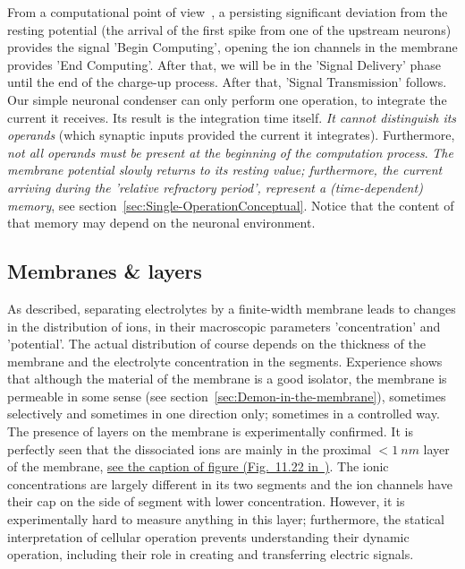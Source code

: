 From a computational point of view~\cite{VeghComputingModel:2021},
a persisting significant deviation from the resting potential (the
arrival of the first spike from one of the upstream neurons) provides
the signal 'Begin Computing', opening the ion channels in the membrane
provides 'End Computing'. After that, we will be in the 'Signal Delivery'
phase until the end of the charge-up process. After that, 'Signal
Transmission' follows. Our simple neuronal condenser can only perform
one operation, to integrate the current it receives. Its
result is the integration time itself. \emph{It cannot distinguish
	its operands} (which synaptic inputs provided the current it integrates).
Furthermore, \emph{not all operands must be present at the beginning of the computation process}.
\emph{The membrane potential slowly returns to its resting value;
furthermore, the current arriving during the 	'relative refractory period', represent a (time-dependent)
memory}, see section~\ref{sec:Single-OperationConceptual}.
Notice that the content of that memory may depend on the
neuronal environment.



\subsection{Membranes \& layers\label{sec:Physics-Membranes}}


As described, separating electrolytes by a finite-width membrane leads to changes in the distribution of ions, 
in their macroscopic parameters 'concentration' and 'potential'. The actual distribution of course depends
on the thickness of the membrane and the electrolyte concentration in the segments. Experience shows that
although the material of the membrane is a good isolator,
the membrane is permeable in some sense (see section~\ref{sec:Demon-in-the-membrane}), sometimes selectively and
sometimes in one direction only; sometimes in a controlled way.
The presence of layers on the membrane is experimentally confirmed. It is perfectly seen that the dissociated ions
are mainly in the proximal $<1~nm$ layer of the membrane,
\href{https://www.ncbi.nlm.nih.gov/books/NBK26910/figure/A2034/?report=objectonly}{see the caption of figure (Fig.~11.22 in~\cite{MolecularBiology:2002})}. The 
ionic concentrations are largely different in its two segments and the ion channels have their cap on the side of segment with lower concentration.
However, it is experimentally hard to measure anything
in this layer; furthermore, the statical interpretation 
of cellular operation prevents understanding their
dynamic operation, including their role in creating and transferring electric signals.

